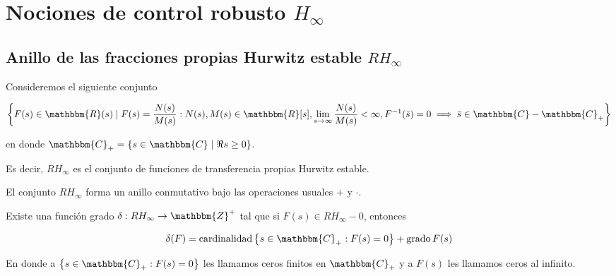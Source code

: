 
\chapter{Nociones de control robusto $H_{\infty}$}


    \section{Anillo de las fracciones propias Hurwitz estable $RH_{\infty}$}

        Consideremos el siguiente conjunto

        \begin{equation}
            \left\{ F(s) \in \mathbbm{R}(s) \mid F(s) = \frac{N(s)}{M(s)} : N(s), M(s) \in \mathbbm{R}[s], \lim_{s \to \infty} \frac{N(s)}{M(s)} < \infty, F^{-1}(\bar{s}) = 0 \implies \bar{s} \in \mathbbm{C} - \mathbbm{C}_+ \right\}
        \end{equation}

        en donde $\mathbbm{C}_+ = \left\{ s \in \mathbbm{C} \mid \Re{s} \ge 0 \right\}$.

        Es decir, $RH_{\infty}$ es el conjunto de funciones de transferencia propias Hurwitz estable.

        \begin{definicion}
            El conjunto $RH_{\infty}$ forma un anillo conmutativo bajo las operaciones usuales $+$ y $\cdot$.
        \end{definicion}

        \begin{definicion}
            Existe una función grado $\delta: RH_{\infty} \to \mathbbm{Z}^+$ tal que si $F(s) \in RH_{\infty} - {0}$, entonces

            \begin{equation}
                \delta(F) = \cardinalidad{\left\{ s \in \mathbbm{C}_+ : F(s) = 0 \right\}} + \grado{F(s)}
            \end{equation}

            En donde a $\left\{ s \in \mathbbm{C}_+ : F(s) = 0 \right\}$ les llamamos ceros finitos en $\mathbbm{C}_+$ y a $F(s)$ les llamamos ceros al infinito.
        \end{definicion}

